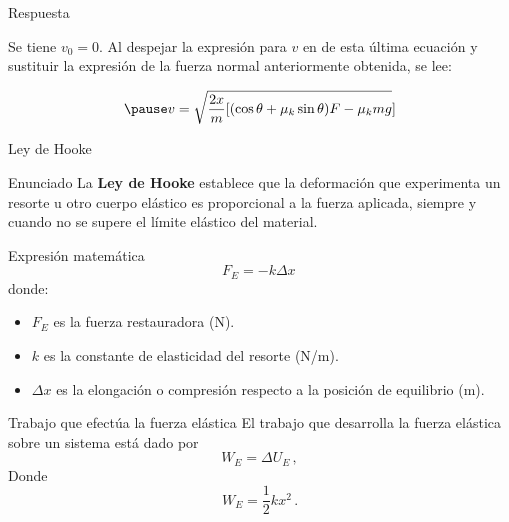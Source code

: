     \begin{frame}{Respuesta}
    
    \pause Se tiene $v_0=0$. Al despejar la expresión para $v$ en de esta última ecuación y sustituir la expresión de la fuerza normal anteriormente obtenida, se lee:
    
        \begin{equation}
        \pause     v=\sqrt{\frac{2x}{m}[(\cos\theta+\mu_k\sin\theta)F-\mu_kmg}]
        \end{equation}
    \end{frame}

    \begin{frame}{Ley de Hooke}
    \begin{block}{Enunciado}
        La \textbf{Ley de Hooke} establece que la deformación que experimenta un
        resorte u otro cuerpo elástico es proporcional a la fuerza aplicada, 
        siempre y cuando no se supere el límite elástico del material.
    \end{block}

    \vspace{0.3cm}

    \begin{block}{Expresión matemática}
        \[
            F_E = -k \Delta x\,
        \]
        donde:
        \begin{itemize}
            \item $F_E$ es la fuerza restauradora (N).
            \item $k$ es la constante de elasticidad del resorte (N/m).
            \item $\Delta x$ es la elongación o compresión respecto a la posición de equilibrio (m).
        \end{itemize}
    \end{block}

\end{frame}

\begin{frame}{Trabajo que efectúa la fuerza elástica}
    El trabajo que desarrolla la fuerza elástica sobre un sistema está dado por \begin{equation}
        W_E=\Delta U_E\,,
    \end{equation} Donde \begin{equation}
        W_E=\frac{1}{2}k x^2\,.
    \end{equation}
\end{frame}

